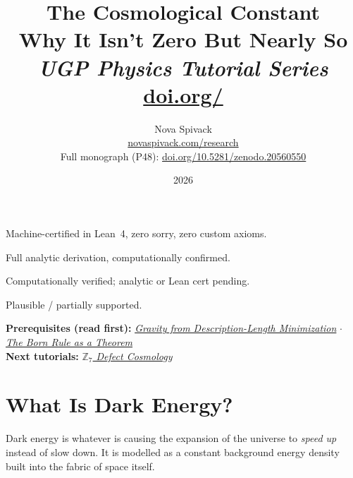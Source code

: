 \documentclass[11pt,a4paper]{article}
\title{\textbf{The Cosmological Constant}\\[6pt]
\large Why It Isn't Zero But Nearly So\\[4pt]\normalsize\textit{UGP Physics Tutorial Series}
\\[2pt]\small\href{https://doi.org/\TutorialDOI}{doi.org/\TutorialDOI}}
\author{Nova Spivack\\[4pt]
\normalsize
\href{https://novaspivack.com/research}{novaspivack.com/research}\\[2pt]
\small Full monograph (P48):
\href{https://doi.org/10.5281/zenodo.20560550}{doi.org/10.5281/zenodo.20560550}
}
\date{2026}
\newcommand{\CatAL}{\textsc{CatAL}}
\newcommand{\CatAD}{\textsc{CatAD}}
\newcommand{\CatA}{\textsc{CatA}}
\newcommand{\CatB}{\textsc{CatB}}
\begin{document}
\setcounter{tocdepth}{2}
\maketitle

\begin{tcolorbox}[colback=boxblue,colframe=blue!40!black,
  title={Claim-strength taxonomy (used throughout)}]
\begin{description}[leftmargin=2.2em,labelwidth=2em,labelsep=.5em]
  \item[\CatAL] Machine-certified in Lean~4, zero sorry, zero custom axioms.
  \item[\CatAD] Full analytic derivation, computationally confirmed.
  \item[\CatA]  Computationally verified; analytic or Lean cert pending.
  \item[\CatB]  Plausible / partially supported.
\end{description}
\end{tcolorbox}

\vspace{4pt}
\tableofcontents
\newpage

\begin{tcolorbox}[colback=blue!6,colframe=blue!40!black,
  title=\textbf{UGP Physics Tutorial Series}]
\textbf{Prerequisites (read first):} \href{https://doi.org/10.5281/zenodo.20657870}{\emph{Gravity from Description-Length Minimization}} $\cdot$ \href{https://doi.org/10.5281/zenodo.20657861}{\emph{The Born Rule as a Theorem}}\\[4pt]
\textbf{Next tutorials:} \href{https://doi.org/10.5281/zenodo.20657866}{\emph{$\mathbb{Z}_7$ Defect Cosmology}}\\[4pt]
\end{tcolorbox}


\section{What Is Dark Energy?}

\begin{tcolorbox}[colback=boxblue,colframe=blue!40!black,
  title={The one-line answer}]
Dark energy is whatever is causing the expansion of the universe to
\emph{speed up} instead of slow down.  It is modelled as a constant background
energy density built into the fabric of space itself.
\end{tcolorbox}
\end{document}
